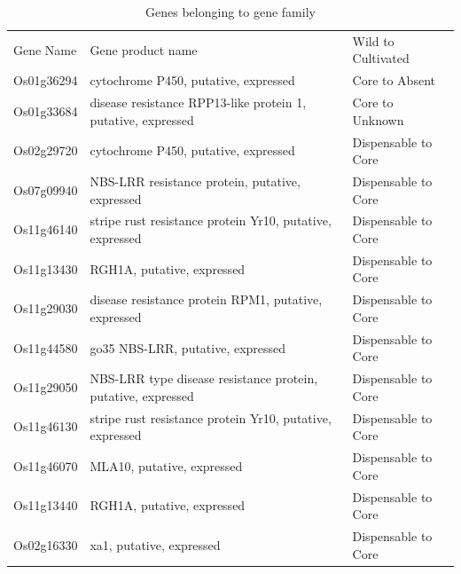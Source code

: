 \documentclass[10pt,letterpaper]{article}
\begin{document}
\begin{table}[]
\centering
\begin{tabular}{lll}
Gene Name  & Gene product name                                            & Wild to Cultivated  \\
Os01g36294 & cytochrome P450, putative, expressed                         & Core to Absent      \\
Os01g33684 & disease resistance RPP13-like protein 1, putative, expressed & Core to Unknown     \\
Os02g29720 & cytochrome P450, putative, expressed                         & Dispensable to Core \\
Os07g09940 & NBS-LRR resistance protein, putative, expressed              & Dispensable to Core \\
Os11g46140 & stripe rust resistance protein Yr10, putative, expressed     & Dispensable to Core \\
Os11g13430 & RGH1A, putative, expressed                                   & Dispensable to Core \\
Os11g29030 & disease resistance protein RPM1, putative, expressed         & Dispensable to Core \\
Os11g44580 & go35 NBS-LRR, putative, expressed                            & Dispensable to Core \\
Os11g29050 & NBS-LRR type disease resistance protein, putative, expressed & Dispensable to Core \\
Os11g46130 & stripe rust resistance protein Yr10, putative, expressed     & Dispensable to Core \\
Os11g46070 & MLA10, putative, expressed                                   & Dispensable to Core \\
Os11g13440 & RGH1A, putative, expressed                                   & Dispensable to Core \\
Os02g16330 & xa1, putative, expressed                                     & Dispensable to Core                  
\end{tabular}
\caption{Genes belonging to gene family}
\label{GFdetails}
\end{table}

\clearpage
\end{document}
